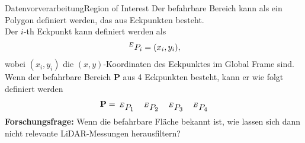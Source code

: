\documentclass[169, handout	]{THIbeamer} %
\begin{document}
	\begin{frame}{Datenvorverarbeitung}{Region of Interest}
		Der befahrbare Bereich kann als ein Polygon definiert werden, das aus Eckpunkten besteht.\\
		Der $i$-th Eckpunkt kann definiert werden als
		\begin{align}
			\hspace*{0.2em}^E\vspace*{-0.2em}P_{i}=(x_i,y_i),
		\end{align}
wobei $(x_i,y_i)$ die $(x,y)$-Koordinaten des Eckpunktes im Global Frame sind.\\
		Wenn der befahrbare Bereich $\mathbf{P}$ aus 4 Eckpunkten besteht, kann er wie folgt definiert werden
		\begin{align}
			\mathbf{P}=\begin{matrix}
				\hspace*{0.2em}^E\vspace*{-0.2em}P_{1}&\hspace*{0.2em}^E\vspace*{-0.2em}P_{2}&\hspace*{0.2em}^E\vspace*{-0.2em}P_{3}&\hspace*{0.2em}^E\vspace*{-0.2em}P_{4}
			\end{matrix}
		\end{align}
	\textbf{Forschungsfrage:} Wenn die befahrbare Fläche bekannt ist, wie lassen sich dann nicht relevante LiDAR-Messungen herausfiltern? 
	\end{frame}
\end{document}

